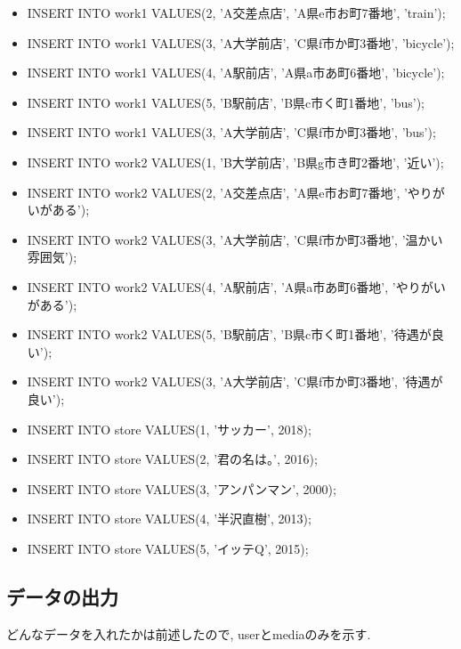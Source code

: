 \documentclass{jarticle}
\begin{document}
\begin{itemize}
\item INSERT INTO work1 VALUES(2, 'A交差点店', 'A県e市お町7番地', 'train');
\item INSERT INTO work1 VALUES(3, 'A大学前店', 'C県f市か町3番地', 'bicycle');
\item INSERT INTO work1 VALUES(4, 'A駅前店', 'A県a市あ町6番地', 'bicycle');
\item INSERT INTO work1 VALUES(5, 'B駅前店', 'B県c市く町1番地', 'bus');
\item INSERT INTO work1 VALUES(3, 'A大学前店', 'C県f市か町3番地', 'bus');
\item INSERT INTO work2 VALUES(1, 'B大学前店', 'B県g市き町2番地', '近い');
\item INSERT INTO work2 VALUES(2, 'A交差点店', 'A県e市お町7番地', 'やりがいがある');
\item INSERT INTO work2 VALUES(3, 'A大学前店', 'C県f市か町3番地', '温かい雰囲気');
\item INSERT INTO work2 VALUES(4, 'A駅前店', 'A県a市あ町6番地', 'やりがいがある');
\item INSERT INTO work2 VALUES(5, 'B駅前店', 'B県c市く町1番地', '待遇が良い');
\item INSERT INTO work2 VALUES(3, 'A大学前店', 'C県f市か町3番地', '待遇が良い');
\item INSERT INTO store VALUES(1, 'サッカー', 2018);
\item INSERT INTO store VALUES(2, '君の名は。', 2016);
\item INSERT INTO store VALUES(3, 'アンパンマン', 2000);
\item INSERT INTO store VALUES(4, '半沢直樹', 2013);
\item INSERT INTO store VALUES(5, 'イッテQ', 2015);
\end{itemize}
\subsection{データの出力}
どんなデータを入れたかは前述したので, userとmediaのみを示す.
\end{document}
